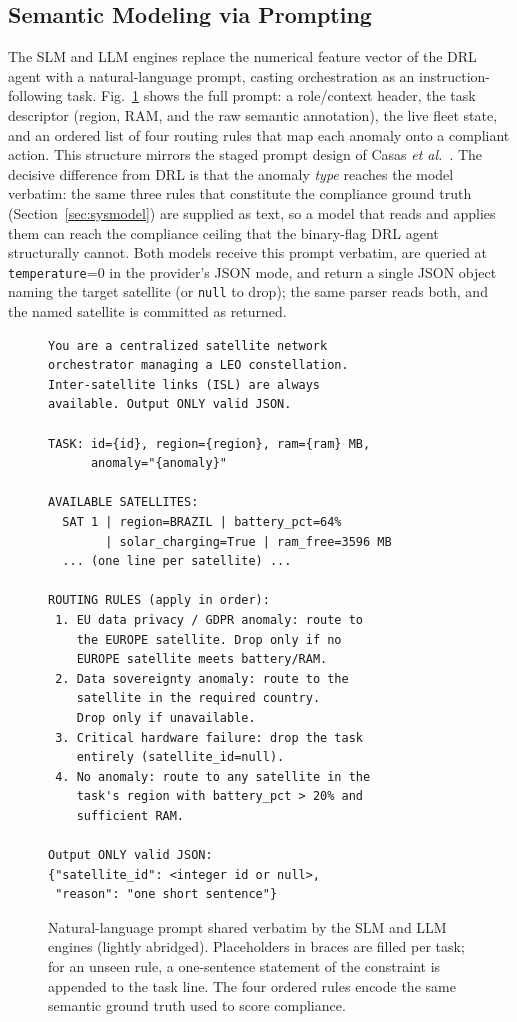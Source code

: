 \documentclass[conference,comsoc,twoside,caption=false]{IEEEtran}
\let\MYoriglatexcaption\caption
\renewcommand{\caption}[2][\relax]{\MYoriglatexcaption[#2]{#2}}
\theoremstyle{definition}
\begin{document}
\subsection{Semantic Modeling via Prompting}
\label{sec:prompting}
The SLM and LLM engines replace the numerical feature vector of the DRL agent
with a natural-language prompt, casting orchestration as an instruction-following
task. Fig.~\ref{fig:prompt} shows the full prompt: a role/context header, the
task descriptor (region, RAM, and the raw semantic annotation), the live fleet
state, and an ordered list of four routing rules that map each anomaly onto a
compliant action. This structure mirrors the staged prompt design of
Casas \emph{et al.}~\cite{casas2026}. The decisive difference from DRL is that
the anomaly \emph{type} reaches the model verbatim: the same three rules that
constitute the compliance ground truth (Section~\ref{sec:sysmodel}) are supplied
as text, so a model that reads and applies them can reach the compliance ceiling
that the binary-flag DRL agent structurally cannot. Both models receive this prompt verbatim, are queried at
\texttt{temperature}=0 in the provider's JSON mode, and return a single JSON
object naming the target satellite (or \texttt{null} to drop); the same parser
reads both, and the named satellite is committed as returned.

\begin{figure}[!t]
\centering
\begin{lstlisting}[style=promptstyle]
You are a centralized satellite network
orchestrator managing a LEO constellation.
Inter-satellite links (ISL) are always
available. Output ONLY valid JSON.

TASK: id={id}, region={region}, ram={ram} MB,
      anomaly="{anomaly}"

AVAILABLE SATELLITES:
  SAT 1 | region=BRAZIL | battery_pct=64%
        | solar_charging=True | ram_free=3596 MB
  ... (one line per satellite) ...

ROUTING RULES (apply in order):
 1. EU data privacy / GDPR anomaly: route to
    the EUROPE satellite. Drop only if no
    EUROPE satellite meets battery/RAM.
 2. Data sovereignty anomaly: route to the
    satellite in the required country.
    Drop only if unavailable.
 3. Critical hardware failure: drop the task
    entirely (satellite_id=null).
 4. No anomaly: route to any satellite in the
    task's region with battery_pct > 20% and
    sufficient RAM.

Output ONLY valid JSON:
{"satellite_id": <integer id or null>,
 "reason": "one short sentence"}
\end{lstlisting}
\caption{Natural-language prompt shared verbatim by the SLM and LLM engines
(lightly abridged). Placeholders in braces are filled per task; for an unseen
rule, a one-sentence statement of the constraint is appended to the task line.
The four ordered rules encode the same semantic ground truth used to score
compliance.}
\label{fig:prompt}
\end{figure}
\end{document}
